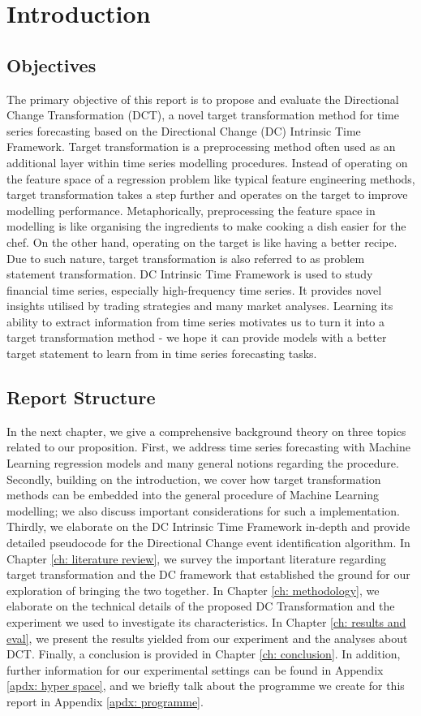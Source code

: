 \chapter{Introduction}

\section{Objectives}
The primary objective of this report is to propose and evaluate the Directional Change Transformation (DCT), a novel target transformation method for time series forecasting based on the Directional Change (DC) Intrinsic Time Framework. Target transformation is a preprocessing method often used as an additional layer within time series modelling procedures. Instead of operating on the feature space of a regression problem like typical feature engineering methods, target transformation takes a step further and operates on the target to improve modelling performance. Metaphorically, preprocessing the feature space in modelling is like organising the ingredients to make cooking a dish easier for the chef. On the other hand, operating on the target is like having a better recipe. Due to such nature, target transformation is also referred to as problem statement transformation. DC Intrinsic Time Framework is used to study financial time series, especially high-frequency time series. It provides novel insights utilised by trading strategies and many market analyses. Learning its ability to extract information from time series motivates us to turn it into a target transformation method - we hope it can provide models with a better target statement to learn from in time series forecasting tasks.

\section{Report Structure}
In the next chapter, we give a comprehensive background theory on three topics related to our proposition. First, we address time series forecasting with Machine Learning regression models and many general notions regarding the procedure. Secondly, building on the introduction, we cover how target transformation methods can be embedded into the general procedure of Machine Learning modelling; we also discuss important considerations for such a implementation. Thirdly, we elaborate on the DC Intrinsic Time Framework in-depth and provide detailed pseudocode for the Directional Change event identification algorithm. In Chapter \ref{ch: literature review}, we survey the important literature regarding target transformation and the DC framework that established the ground for our exploration of bringing the two together. In Chapter \ref{ch: methodology}, we elaborate on the technical details of the proposed DC Transformation and the experiment we used to investigate its characteristics. In Chapter \ref{ch: results and eval}, we present the results yielded from our experiment and the analyses about DCT. Finally, a conclusion is provided in Chapter \ref{ch: conclusion}. In addition, further information for our experimental settings can be found in Appendix \ref{apdx: hyper space}, and we briefly talk about the programme we create for this report in Appendix \ref{apdx: programme}.
